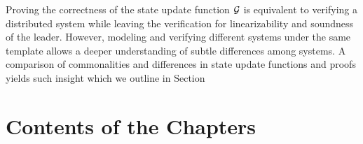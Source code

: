 {Proving the correctness of the state update function $\mathcal{G}$ is equivalent to
verifying a distributed system while leaving the verification for linearizability
and soundness of the leader. However, modeling and verifying different systems
under the same template allows a deeper understanding of subtle differences among systems.
A comparison of commonalities and differences in state update functions
and proofs yields such insight which we outline in Section



\section{Contents of the Chapters}
\label{chapter:introduction:sec:contents-of-the-chapters}

}